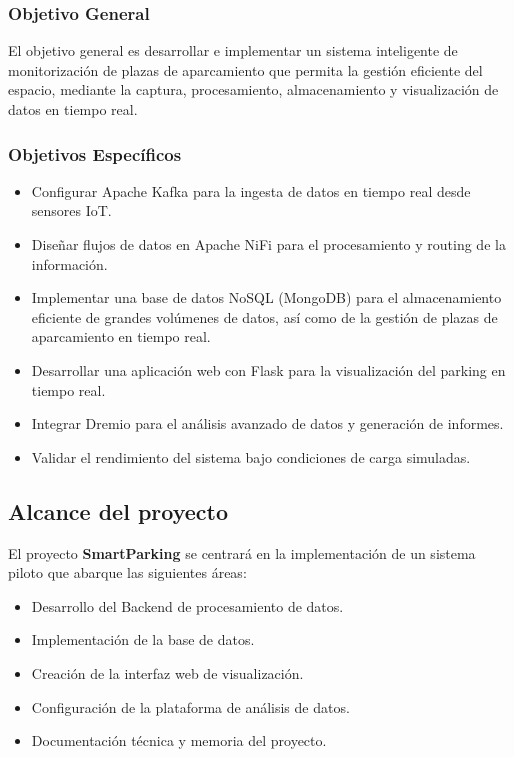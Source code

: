 \documentclass{../../../miPlantilla}
\begin{document}
\subsubsection{Objetivo General}
El objetivo general es desarrollar e implementar un sistema inteligente de monitorización de plazas de aparcamiento que
permita la gestión eficiente del espacio, mediante la captura, procesamiento, almacenamiento y visualización de datos en
tiempo real.

\newpage

\subsubsection{Objetivos Específicos}
\begin{itemize}
  \item Configurar Apache Kafka para la ingesta de datos en tiempo real desde sensores IoT.
  \item Diseñar flujos de datos en Apache NiFi para el procesamiento y routing de la información.
  \item Implementar una base de datos NoSQL (MongoDB) para el almacenamiento eficiente de grandes volúmenes de datos, 
        así como de la gestión de plazas de aparcamiento en tiempo real.
  \item Desarrollar una aplicación web con Flask para la visualización del parking en tiempo real.
  \item Integrar Dremio para el análisis avanzado de datos y generación de informes.
  \item Validar el rendimiento del sistema bajo condiciones de carga simuladas.
\end{itemize}

\subsection{Alcance del proyecto}
El proyecto \textbf{SmartParking} se centrará en la implementación de un sistema piloto que abarque las siguientes
áreas:
\begin{itemize}
  \item Desarrollo del Backend de procesamiento de datos.
  \item Implementación de la base de datos.
  \item Creación de la interfaz web de visualización.
  \item Configuración de la plataforma de análisis de datos.
  \item Documentación técnica y memoria del proyecto.
\end{itemize}
\end{document}
